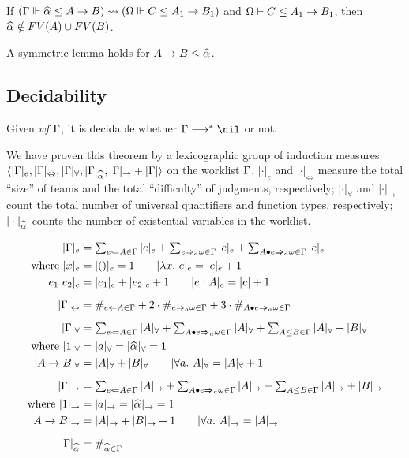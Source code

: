 \begin{lemma}
If $(\Gm \Vdash \al \le A \to B) \sto (\Om \Vdash C \le A_1 \to B_1)$ and
$\Omega \vdash C \le A_1 \to B_1$, then $\al\notin FV(A) \cup FV(B)$.
\end{lemma}

A symmetric lemma holds for $A\to B \le \al$.

\subsection{Decidability}
\begin{theorem}[Decidability]
Given \emph{wf }$\Gamma$, it is decidable whether $\Gm\redto\nil$ or not.
\end{theorem}

We have proven this theorem by a lexicographic group of induction measures\\
$\langle |\Gm|_e, |\Gm|_\Leftrightarrow, |\Gm|_\forall, |\Gm|_{\al}, |\Gm|_\to + |\Gm| \rangle$
on the worklist $\Gamma$.
$|\cdot|_e$ and $|\cdot|_\Leftrightarrow$ measure the total ``size'' of teams
and the total ``difficulty'' of judgments, respectively;
$|\cdot|_\forall$ and $|\cdot|_\to$ count the total number of
universal quantifiers and function types, respectively;
$|\cdot|_{\al}$ counts the number of existential variables in the worklist.

\begin{definition}
\begin{gather*}
\begin{aligned}
|\Gm|_e &= \textstyle\sum_{e\Lto A\in\Gm}|e|_e + \sum_{e\To_a \jg\in\Gm}|e|_e +
    \sum_{\appInfAlg{A}{e}\in\Gm}|e|_e\\
\text{where } |x|_e &= |()|_e = 1 \qquad |\lam e|_e = |e|_e + 1\\
|e_1~e_2|_e &= |e_1|_e + |e_2|_e + 1 \qquad |e:A|_e = |e| + 1\\[2mm]
%
|\Gm|_\Leftrightarrow &= \#_{e\Lto A\in\Gm} +
    2\cdot\#_{e\To_a \jg\in\Gm} + 3\cdot\#_{\appInfAlg{A}{e}\in\Gm}\\[2mm]
|\Gm|_\forall &= \textstyle\sum_{e\Lto A\in\Gm}|A|_\forall + \sum_{\appInfAlg{A}{e}\in\Gm}|A|_\forall +
    \sum_{A\le B\in\Gm} |A|_\forall + |B|_\forall\\
\text{where } |1|_\forall &= |a|_\forall = |\al|_\forall = 1\\
|A\to B|_\forall &= |A|_\forall + |B|_\forall \qquad |\all A|_\forall = |A|_\forall + 1\\[2mm]
%
|\Gm|_\to &= \textstyle\sum_{e\Lto A\in\Gm}|A|_\to + \sum_{\appInfAlg{A}{e}\in\Gm}|A|_\to +
    \sum_{A\le B\in\Gm} |A|_\to + |B|_\to\\
\text{where } |1|_\to &= |a|_\to = |\al|_\to = 1\\
|A\to B|_\to &= |A|_\to + |B|_\to + 1 \qquad |\all A|_\to = |A|_\to\\[2mm]
%
|\Gm|_{\al} &= \#_{\al\in\Gm}\\
\end{aligned}
\end{gather*}
\end{definition}

